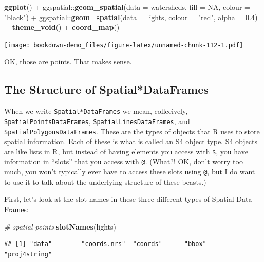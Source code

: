 \documentclass[]{book}
\newenvironment{Shaded}{\begin{snugshade}}{\end{snugshade}}
\newcommand{\KeywordTok}[1]{\textcolor[rgb]{0.13,0.29,0.53}{\textbf{{#1}}}}
\newcommand{\DataTypeTok}[1]{\textcolor[rgb]{0.13,0.29,0.53}{{#1}}}
\newcommand{\FloatTok}[1]{\textcolor[rgb]{0.00,0.00,0.81}{{#1}}}
\newcommand{\StringTok}[1]{\textcolor[rgb]{0.31,0.60,0.02}{{#1}}}
\newcommand{\CommentTok}[1]{\textcolor[rgb]{0.56,0.35,0.01}{\textit{{#1}}}}
\newcommand{\OtherTok}[1]{\textcolor[rgb]{0.56,0.35,0.01}{{#1}}}
\newcommand{\NormalTok}[1]{{#1}}
\theoremstyle{definition}
\theoremstyle{definition}
\theoremstyle{remark}
\begin{document}
\begin{Shaded}
\begin{Highlighting}[]
\KeywordTok{ggplot}\NormalTok{() +}
\StringTok{  }\NormalTok{ggspatial::}\KeywordTok{geom_spatial}\NormalTok{(}\DataTypeTok{data =} \NormalTok{watersheds, }\DataTypeTok{fill =} \OtherTok{NA}\NormalTok{, }\DataTypeTok{colour =} \StringTok{"black"}\NormalTok{) +}
\StringTok{  }\NormalTok{ggspatial::}\KeywordTok{geom_spatial}\NormalTok{(}\DataTypeTok{data =} \NormalTok{lights, }\DataTypeTok{colour =} \StringTok{"red"}\NormalTok{, }\DataTypeTok{alpha =} \FloatTok{0.4}\NormalTok{) +}
\StringTok{  }\KeywordTok{theme_void}\NormalTok{() +}
\StringTok{  }\KeywordTok{coord_map}\NormalTok{()}
\end{Highlighting}
\end{Shaded}

\texttt{[image: bookdown-demo\_files/figure-latex/unnamed-chunk-112-1.pdf]}

OK, those are points. That makes sense.

\subsection{The Structure of
Spatial*DataFrames}\label{the-structure-of-spatialdataframes}

When we write \texttt{Spatial*DataFrames} we mean, collecively,
\texttt{SpatialPointsDataFrames}, \texttt{SpatialLinesDataFrames}, and
\texttt{SpatialPolygonsDataFrames}. These are the types of objects that
R uses to store spatial information. Each of these is what is called an
S4 object type. S4 objects are like lists in R, but instead of having
elements you access with \texttt{\$}, you have information in ``slots''
that you access with \texttt{@}. (What?! OK, don't worry too much, you
won't typically ever have to access these slots using \texttt{@}, but I
do want to use it to talk about the underlying structure of these
beasts.)

First, let's look at the slot names in these three different types of
Spatial Data Frames:

\begin{Shaded}
\begin{Highlighting}[]
\CommentTok{# spatial points}
\KeywordTok{slotNames}\NormalTok{(lights)}
\end{Highlighting}
\end{Shaded}

\begin{verbatim}
## [1] "data"        "coords.nrs"  "coords"      "bbox"        "proj4string"
\end{verbatim}
\end{document}
